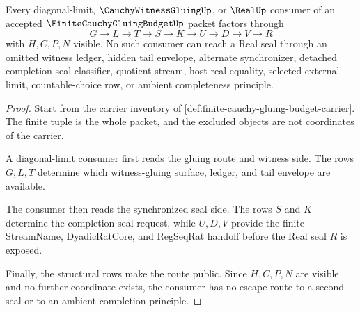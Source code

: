 \begin{theorem}
\label{thm:finite-cauchy-gluing-budget-nonescape}
Every diagonal-limit, $\CauchyWitnessGluingUp$, or $\RealUp$ consumer of an accepted $\FiniteCauchyGluingBudgetUp$ packet factors through
$$
G \to L \to T \to S \to K \to U \to D \to V \to R
$$
with $H,C,P,N$ visible. No such consumer can reach a Real seal through an omitted witness ledger, hidden tail envelope, alternate synchronizer, detached completion-seal classifier, quotient stream, host real equality, selected external limit, countable-choice row, or ambient completeness principle.
\end{theorem}
\begin{proof}
Start from the carrier inventory of \autoref{def:finite-cauchy-gluing-budget-carrier}. The finite tuple is the whole packet, and the excluded objects are not coordinates of the carrier.

A diagonal-limit consumer first reads the gluing route and witness side. The rows $G,L,T$ determine which witness-gluing surface, ledger, and tail envelope are available.

The consumer then reads the synchronized seal side. The rows $S$ and $K$ determine the completion-seal request, while $U,D,V$ provide the finite StreamName, DyadicRatCore, and RegSeqRat handoff before the Real seal $R$ is exposed.

Finally, the structural rows make the route public. Since $H,C,P,N$ are visible and no further coordinate exists, the consumer has no escape route to a second seal or to an ambient completion principle.
\end{proof}

